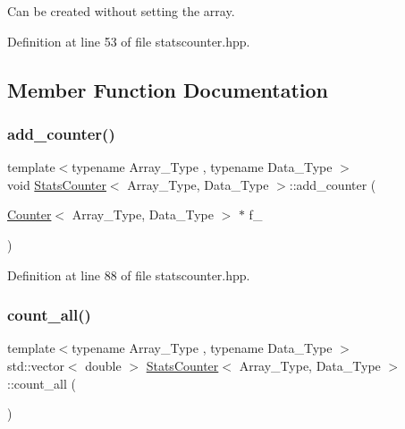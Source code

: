 Can be created without setting the array. 



Definition at line 53 of file statscounter.\+hpp.



\subsection{Member Function Documentation}
\mbox{\label{class_stats_counter_a829e41243a7b18cf71337deeec9f7030}} 
\subsubsection{\texorpdfstring{add\+\_\+counter()}{add\_counter()}}
{\footnotesize\ttfamily template$<$typename Array\+\_\+\+Type , typename Data\+\_\+\+Type $>$ \\
void \hyperlink{class_stats_counter}{Stats\+Counter}$<$ Array\+\_\+\+Type, Data\+\_\+\+Type $>$\+::add\+\_\+counter (\begin{DoxyParamCaption}\item[{\hyperlink{class_counter}{Counter}$<$ Array\+\_\+\+Type, Data\+\_\+\+Type $>$ $\ast$}]{f\+\_\+ }\end{DoxyParamCaption})\hspace{0.3cm}{\ttfamily [inline]}}



Definition at line 88 of file statscounter.\+hpp.

\mbox{\label{class_stats_counter_a83bd92031a1499109c98f238221cbd67}} 
\subsubsection{\texorpdfstring{count\+\_\+all()}{count\_all()}}
{\footnotesize\ttfamily template$<$typename Array\+\_\+\+Type , typename Data\+\_\+\+Type $>$ \\
std\+::vector$<$ double $>$ \hyperlink{class_stats_counter}{Stats\+Counter}$<$ Array\+\_\+\+Type, Data\+\_\+\+Type $>$\+::count\+\_\+all (\begin{DoxyParamCaption}{ }\end{DoxyParamCaption})\hspace{0.3cm}{\ttfamily [inline]}}




